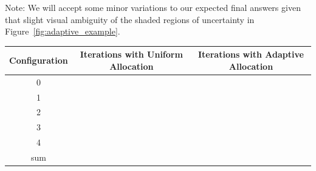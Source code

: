 \documentclass{exam}
\begin{document}
\begin{enumerate}[label=(\alph*)]
    Note: We will accept some minor variations to our expected final answers given that slight visual ambiguity of the shaded  regions of uncertainty in Figure~\ref{fig:adaptive_example}.
    
\renewcommand{\arraystretch}{2}
   \begin{table}[ht]
        \begin{tabular}{|c|c|c|}\hline
        \textbf{Configuration} & \textbf{Iterations with Uniform Allocation} & \textbf{Iterations with Adaptive Allocation}  \\ \hline\hline
        0 & & \\ \hline
        1 & & \\ \hline
        2 & & \\ \hline
        3 & & \\ \hline
        4 & & \\ \hline
        sum & & \\ \hline
    \end{tabular}
    \end{table}

\end{enumerate}
\end{document}
